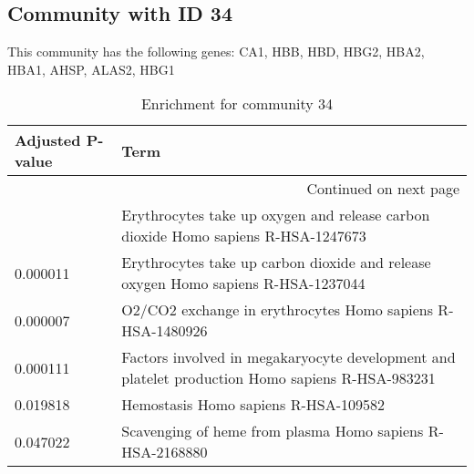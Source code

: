 \subsection*{Community with ID 34}
This community has the following genes: CA1, HBB, HBD, HBG2, HBA2, HBA1, AHSP, ALAS2, HBG1
\\
\begin{longtable}{p{2.4cm}p{14.5cm}}
\caption{Enrichment for community 34}\\
\toprule
Adjusted \newline P-value &                                                                                             Term \\
\midrule
\endhead
\midrule
\multicolumn{2}{r}{{Continued on next page}} \\
\midrule
\endfoot

\bottomrule
\endlastfoot
                 0.000005 &                Erythrocytes take up oxygen and release carbon dioxide Homo sapiens R-HSA-1247673 \\
                 0.000011 &                Erythrocytes take up carbon dioxide and release oxygen Homo sapiens R-HSA-1237044 \\
                 0.000007 &                                       O2/CO2 exchange in erythrocytes Homo sapiens R-HSA-1480926 \\
                 0.000111 &  Factors involved in megakaryocyte development and platelet production Homo sapiens R-HSA-983231 \\
                 0.019818 &                                                             Hemostasis Homo sapiens R-HSA-109582 \\
                 0.047022 &                                        Scavenging of heme from plasma Homo sapiens R-HSA-2168880 \\
\end{longtable}


